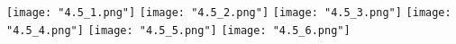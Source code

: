 \begin{center}
    \texttt{[image: "4.5\_1.png"]}
    \texttt{[image: "4.5\_2.png"]}
    \texttt{[image: "4.5\_3.png"]}
    \texttt{[image: "4.5\_4.png"]}
    \texttt{[image: "4.5\_5.png"]}
    \texttt{[image: "4.5\_6.png"]}
\end{center}
